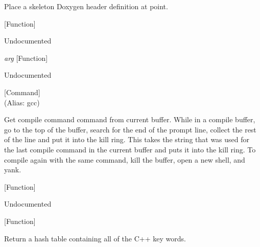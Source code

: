 \begin{doc-string}
Place a skeleton Doxygen header definition at point.
\end{doc-string}

\vspace{1em}
\noindent
{}
\usebox{\funcname}
 \hfill [Function]

\begin{doc-string}
Undocumented
\end{doc-string}

\vspace{1em}
\noindent
{}
\usebox{\funcname}\emph{arg}
 \hfill [Function]

\begin{doc-string}
Undocumented
\end{doc-string}

\vspace{1em}
\noindent
{}
\usebox{\funcname}
 \hfill [Command]\\%
 (Alias: gcc)

\begin{doc-string}
Get compile command command from current buffer.  While in a compile buffer,
go to the top of the buffer, search for the end of the prompt line, collect the
rest of the line and put it into the kill ring.  This takes the string that was
used for the last compile command in the current buffer and puts it into the
kill ring.  To compile again with the same command, kill the buffer, open a new
shell, and yank.
\end{doc-string}

\vspace{1em}
\noindent
{}
\usebox{\funcname}
 \hfill [Function]

\begin{doc-string}
Undocumented
\end{doc-string}

\vspace{1em}
\noindent
{}
\usebox{\funcname}
 \hfill [Function]

\begin{doc-string}
Return a hash table containing all of the C++ key words.
\end{doc-string}

